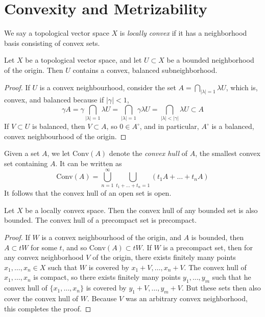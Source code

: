 \section{Convexity and Metrizability}

We say a topological vector space $X$ is \emph{locally convex} if it has a neighborhood basis consisting of convex sets.

\begin{theorem}
    Let $X$ be a topological vector space, and let $U \subset X$ be a bounded neighborhood of the origin. Then $U$ contains a convex, balanced subneighborhood.
\end{theorem}
\begin{proof}
    If $U$ is a convex neighbourhood, consider the set $A = \bigcap_{|\lambda| = 1} \lambda U$, which is, convex, and balanced because if $|\gamma| < 1$,
    \[ \gamma A = \gamma \bigcap_{|\lambda| = 1} \lambda U = \bigcap_{|\lambda| = 1} \gamma \lambda U = \bigcap_{|\lambda| < |\gamma|} \lambda U \subset A \]
    If $V \subset U$ is balanced, then $V \subset A$, so $0 \in A^\circ$, and in particular, $A^\circ$ is a balanced, convex neighbourhood of the origin.
\end{proof}

Given a set $A$, we let $\text{Conv}(A)$ denote the \emph{convex hull} of $A$, the smallest convex set containing $A$. It can be written as
%
\[ \text{Conv}(A) = \bigcup_{n = 1}^\infty \bigcup_{t_1 + \dots + t_n = 1} (t_1A + \dots + t_nA) \]
%
It follows that the convex hull of an open set is open.

\begin{theorem}
    Let $X$ be a locally convex space. Then the convex hull of any bounded set is also bounded. The convex hull of a precompact set is precompact.
\end{theorem}
\begin{proof}
    If $W$ is a convex neighbourhood of the origin, and $A$ is bounded, then $A \subset tW$ for some $t$, and so $\text{Conv}(A) \subset tW$. If $W$ is a precompact set, then for any convex neighborhood $V$ of the origin, there exists finitely many points $x_1,\dots,x_n \in X$ such that $W$ is covered by $x_1 + V, \dots, x_n + V$. The convex hull of $x_1,\dots,x_n$ is compact, so there exists finitely many points $y_1,\dots,y_m$ such that he convex hull of $\{ x_1, \dots, x_n \}$ is covered by $y_1 + V, \dots, y_m + V$. But these sets then also cover the convex hull of $W$. Because $V$ was an arbitrary convex neighborhood, this completes the proof.
\end{proof}

